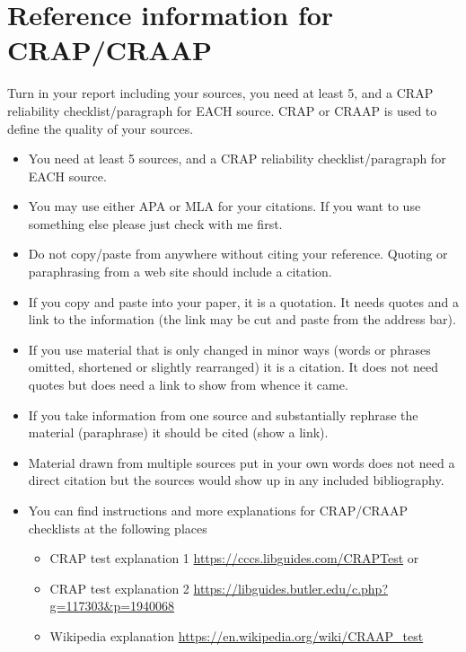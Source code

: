 \documentclass[12pt]{article}
\begin{document}
    \section*{Reference information for CRAP/CRAAP}
    
    Turn in your report including your sources, you need at least 5, and a CRAP reliability checklist/paragraph for EACH  source. CRAP or CRAAP is used to define the quality of your sources. 
    \begin{itemize}

        \item You need at least 5 sources, and a CRAP reliability checklist/paragraph for EACH  source. 
        \item You may use either APA or MLA for your citations. If you want to use something else please just check with me first.
        \item Do not copy/paste from anywhere without citing your reference. Quoting or paraphrasing from a web site should include a citation.
        \item If you copy and paste into your paper, it is a quotation. It needs quotes and a link to the information (the link may be cut and paste from the address bar).
        \item If you use material that is only changed in minor ways (words or phrases omitted, shortened or slightly rearranged) it is a citation. It does not need quotes but does need a link to show from whence it came.
        \item If you take information from one source and substantially rephrase the material (paraphrase) it should be cited (show a link).
        \item Material drawn from multiple sources put in your own words does not need a direct citation but the sources would show up in any included bibliography.
         \item You can find instructions and more explanations for CRAP/CRAAP checklists at the following places
        \begin{itemize}
            \item CRAP test explanation 1 \url{ https://cccs.libguides.com/CRAPTest} or 
            \item CRAP test explanation 2 \url{https://libguides.butler.edu/c.php?g=117303&p=1940068} 
            \item Wikipedia explanation \url{https://en.wikipedia.org/wiki/CRAAP_test}
        \end{itemize}
    \end{itemize}  
\end{document}
